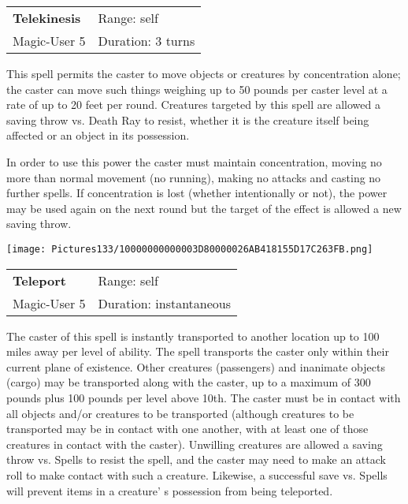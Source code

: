 \documentclass[a4paper,twoside,openany,10pt]{book}
\begin{document}
\begin{multicols}{2}
\smallskip\begin{flushleft} 
	\begin{tabularx}{0.45\textwidth}{@{}m{3.5cm}m{5.5cm}@{}} 
		\textbf{Telekinesis} & Range: self\\
Magic-User 5 &Duration: 3 turns\\
	\end{tabularx}\end{flushleft}

This spell permits the caster to move objects or creatures by concentration alone; the caster can move such things weighing up to 50 pounds per caster level at a rate of up to 20 feet per round. Creatures targeted by this spell are allowed a saving throw vs. Death Ray to resist, whether it is the creature itself being affected or an object in its possession.

In order to use this power the caster must maintain concentration, moving no more than normal movement (no running), making no attacks and casting no further spells. If concentration is lost (whether intentionally or not), the power may be used again on the next round but the target of the effect is allowed a new saving throw.

\medskip

\begin{flushleft}
	\texttt{[image: Pictures133/10000000000003D80000026AB418155D17C263FB.png]}
\end{flushleft}

\smallskip\begin{flushleft} 
	\begin{tabularx}{0.45\textwidth}{@{}m{3.5cm}m{5.5cm}@{}} 
		\textbf{Teleport} & Range: self\\
Magic-User 5 &Duration: instantaneous\\
	\end{tabularx}\end{flushleft}

The caster of this spell is instantly transported to another location up to 100 miles away per level of ability. The spell transports the caster only within their current plane of existence. Other creatures (passengers) and inanimate objects (cargo) may be transported along with the caster, up to a maximum of 300 pounds plus 100 pounds per level above 10th. The caster must be in contact with all objects and/or creatures to be transported (although creatures to be transported may be in contact with one another, with at least one of those creatures in contact with the caster). Unwilling creatures are allowed a saving throw vs. Spells to resist the spell, and the caster may need to make an attack roll to make contact with such a creature. Likewise, a successful save vs. Spells will prevent items in a creature' s possession from being teleported.


\end{multicols}
\end{document}
